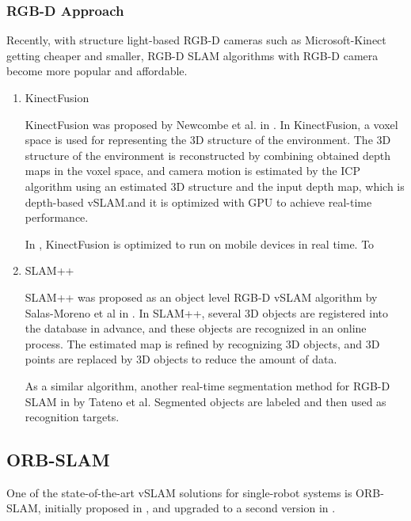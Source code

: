 \subsubsection{RGB-D Approach}
	Recently, with structure light-based RGB-D cameras such as Microsoft-Kinect getting cheaper and smaller, RGB-D SLAM algorithms with RGB-D camera become more popular and affordable.
\begin{enumerate}[1.]
	\item KinectFusion 
	
	KinectFusion was proposed by Newcombe et al. in \cite{newcombe2011kinectfusion}. In KinectFusion, a voxel space is used for representing the 3D structure of the environment. The 3D structure of the environment is reconstructed by combining obtained depth maps in the voxel space, and camera motion is estimated by the ICP algorithm using an estimated 3D structure and the input depth map, which is depth-based vSLAM.and it is optimized with GPU to achieve real-time performance.
	
	In \cite{kahler2015very}, KinectFusion is optimized to run on mobile devices in real time. To 
	
	\item SLAM++
	
	SLAM++ was proposed as an object level RGB-D vSLAM algorithm by Salas-Moreno et al in  \cite{salas2013slam++}. In SLAM++, several 3D objects are registered into the database in advance, and these objects are recognized in an online process. The estimated map is refined by recognizing 3D objects, and 3D points are replaced by 3D objects to reduce the amount of data.
	
	As a similar algorithm, another real-time segmentation method for RGB-D SLAM in 
	\cite{tateno20162} by Tateno et al. Segmented objects are labeled and then used as recognition targets.
	
\end{enumerate}

\subsection{ORB-SLAM}
\label{chp:orbslam}
One of the state-of-the-art vSLAM solutions for single-robot systems is ORB-SLAM, initially proposed in \cite{mur2015orb}, and upgraded to a second version in \cite{mur2017orb}.

